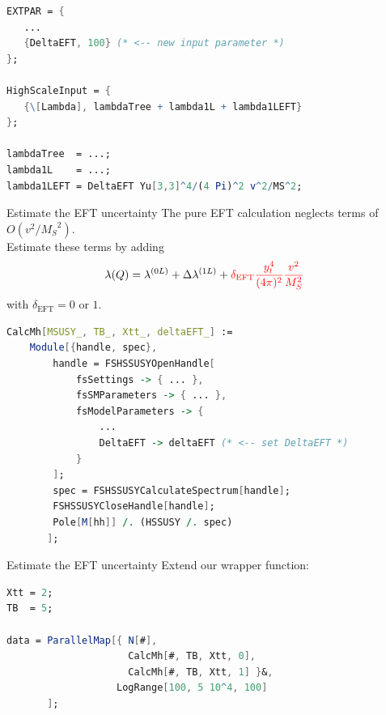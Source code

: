 \documentclass[hyperref={pdfpagelabels=false},ngerman]{beamer}
\newcommand{\MS}{\ensuremath{M_S}}
\begin{document}
\begin{lrbox}{\listbox}\begin{lstlisting}[language=Mathematica]
EXTPAR = {
   ...
   {DeltaEFT, 100} (* <-- new input parameter *)
};

HighScaleInput = {
   {\[Lambda], lambdaTree + lambda1L + lambda1LEFT}
};

lambdaTree  = ...;
lambda1L    = ...;
lambda1LEFT = DeltaEFT Yu[3,3]^4/(4 Pi)^2 v^2/MS^2;
\end{lstlisting}\end{lrbox} %

\begin{frame}{Estimate the EFT uncertainty}
  The pure EFT calculation neglects terms of $O(v^2/\MS^2)$.\\
  Estimate these terms by adding
  \begin{align*}
    \lambda(Q) &= \lambda^{(0L)} + \Delta\lambda^{(1L)}
    + \textcolor{red}{\delta_\text{EFT} \frac{y_t^4}{(4\pi)^2} \frac{v^2}{\MS^2}}
  \end{align*}
  with $\delta_\text{EFT} = 0$ or $1$.\\[1em]
  \usebox{\listbox}
\end{frame}

\begin{lrbox}{\listbox}\begin{lstlisting}[language=Mathematica]
CalcMh[MSUSY_, TB_, Xtt_, deltaEFT_] :=
    Module[{handle, spec},
        handle = FSHSSUSYOpenHandle[
            fsSettings -> { ... },
            fsSMParameters -> { ... },
            fsModelParameters -> {
                ...
                DeltaEFT -> deltaEFT (* <-- set DeltaEFT *)
            }
        ];
        spec = FSHSSUSYCalculateSpectrum[handle];
        FSHSSUSYCloseHandle[handle];
        Pole[M[hh]] /. (HSSUSY /. spec)
       ];
\end{lstlisting}\end{lrbox} %

\begin{frame}{Estimate the EFT uncertainty}
  Extend our wrapper function:\\[2em]
  \usebox{\listbox}
\end{frame}

\begin{lrbox}{\listbox}\begin{lstlisting}[language=Mathematica]
Xtt = 2;
TB  = 5;

data = ParallelMap[{ N[#],
                     CalcMh[#, TB, Xtt, 0],
                     CalcMh[#, TB, Xtt, 1] }&,
                   LogRange[100, 5 10^4, 100]
       ];
\end{lstlisting}\end{lrbox} %
\end{document}
